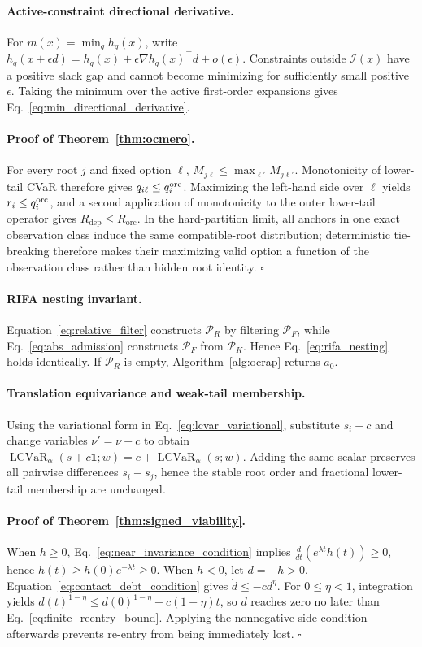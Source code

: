 \documentclass{article} %
\DeclareMathOperator{\LCVaR}{LCVaR}
\newcommand{\cI}{\mathcal{I}}
\newcommand{\cP}{\mathcal{P}}
\newcommand{\Rdep}{R_{\mathrm{dep}}}
\newcommand{\Rorc}{R_{\mathrm{orc}}}
\begin{document}
\paragraph{Active-constraint directional derivative.}
For $m(x)=\min_q h_q(x)$, write $h_q(x+\epsilon d)=h_q(x)+\epsilon\nabla h_q(x)^\top d+o(\epsilon)$. Constraints outside $\cI(x)$ have a positive slack gap and cannot become minimizing for sufficiently small positive $\epsilon$. Taking the minimum over the active first-order expansions gives Eq.~\eqref{eq:min_directional_derivative}.

\paragraph{Proof of Theorem~\ref{thm:ocmero}.}
For every root $j$ and fixed option $\ell$, $M_{j\ell}\le\max_{\ell'}M_{j\ell'}$. Monotonicity of lower-tail CVaR therefore gives $q_{i\ell}\le q_i^{\rm orc}$. Maximizing the left-hand side over $\ell$ yields $r_i\le q_i^{\rm orc}$, and a second application of monotonicity to the outer lower-tail operator gives $\Rdep\le\Rorc$. In the hard-partition limit, all anchors in one exact observation class induce the same compatible-root distribution; deterministic tie-breaking therefore makes their maximizing valid option a function of the observation class rather than hidden root identity. \hfill$\square$

\paragraph{RIFA nesting invariant.}
Equation~\eqref{eq:relative_filter} constructs $\cP_R$ by filtering $\cP_F$, while Eq.~\eqref{eq:abs_admission} constructs $\cP_F$ from $\cP_K$. Hence Eq.~\eqref{eq:rifa_nesting} holds identically. If $\cP_R$ is empty, Algorithm~\ref{alg:ocrap} returns $a_0$.

\paragraph{Translation equivariance and weak-tail membership.}
Using the variational form in Eq.~\eqref{eq:lcvar_variational}, substitute $s_i+c$ and change variables $\nu'=\nu-c$ to obtain $\LCVaR_\alpha(s+c\mathbf 1;w)=c+\LCVaR_\alpha(s;w)$. Adding the same scalar preserves all pairwise differences $s_i-s_j$, hence the stable root order and fractional lower-tail membership are unchanged.

\paragraph{Proof of Theorem~\ref{thm:signed_viability}.}
When $h\ge0$, Eq.~\eqref{eq:near_invariance_condition} implies $\frac{d}{dt}(e^{\lambda t}h(t))\ge0$, hence $h(t)\ge h(0)e^{-\lambda t}\ge0$. When $h<0$, let $d=-h>0$. Equation~\eqref{eq:contact_debt_condition} gives $\dot d\le-cd^\eta$. For $0\le\eta<1$, integration yields $d(t)^{1-\eta}\le d(0)^{1-\eta}-c(1-\eta)t$, so $d$ reaches zero no later than Eq.~\eqref{eq:finite_reentry_bound}. Applying the nonnegative-side condition afterwards prevents re-entry from being immediately lost. \hfill$\square$
\end{document}
